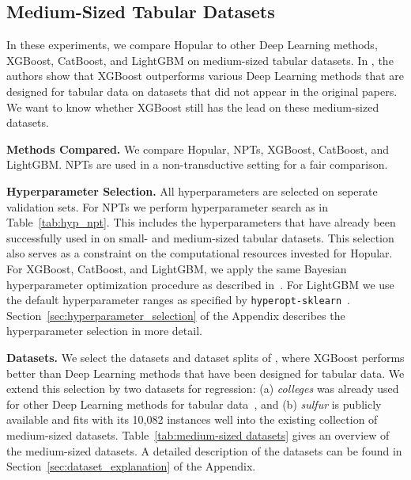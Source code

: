 \documentclass{article}
\theoremstyle{plain}
\theoremstyle{definition}
\theoremstyle{remark}
\begin{document}
\subsection{Medium-Sized Tabular Datasets}
\label{sec:experiments_tabular}

In these experiments, we compare Hopular to other Deep Learning methods,
XGBoost, CatBoost, and LightGBM on medium-sized tabular datasets.
In \citep{ShwartzZiv:21}, the authors show that XGBoost outperforms various
Deep Learning methods that are designed for tabular data on
datasets that did not appear in the original papers.
We want to know whether XGBoost still has the lead on
these medium-sized datasets.

{\bf Methods Compared.}
We compare Hopular, NPTs, XGBoost, CatBoost, and LightGBM.
NPTs are used in a non-transductive setting for a fair comparison.

{\bf Hyperparameter Selection.} 
All hyperparameters are selected on seperate validation sets. For NPTs we perform hyperparameter search as in Table~\ref{tab:hyp_npt}. This includes the hyperparameters that have already been successfully used in \citep{Kossen:21} on small- and medium-sized tabular datasets.
This selection also serves as a constraint on the computational resources invested for Hopular.
For XGBoost, CatBoost, and LightGBM, we apply the same Bayesian hyperparameter optimization 
procedure as described in~\citep{ShwartzZiv:21}. For LightGBM we use the default hyperparameter ranges as specified by \texttt{hyperopt-sklearn}~\citep{Komer:14}.
Section~\ref{sec:hyperparameter_selection} of the Appendix describes the hyperparameter selection in more detail.

{\bf Datasets.}
We select the datasets and dataset splits of \citep{ShwartzZiv:21}, 
where XGBoost performs better than Deep Learning methods that have been
designed for tabular data.
We extend this selection by two datasets for regression: (a) \textit{colleges} was already
used for other Deep Learning methods for tabular data~\citep{Somepalli:21}, and
(b) \textit{sulfur} is publicly available and fits with its 10,082 instances well into
the existing collection of medium-sized datasets.
Table~\ref{tab:medium-sized datasets} gives an overview of the medium-sized datasets.
A detailed description of the datasets can be found in Section~\ref{sec:dataset_explanation} of the Appendix.
\end{document}
